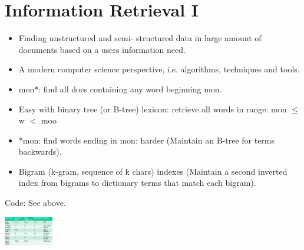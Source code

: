 
\section{Information Retrieval I}

\begin{breakbox}
\begin{itemize}
	\item Finding unstructured and semi- structured data in large amount of documents based on a users information need.
	\item A modern computer science perspective, i.e. algorithms, techniques and tools.
\end{itemize}
\end{breakbox}

\begin{breakbox}

\end{breakbox}

\begin{breakbox}
\begin{itemize}
	\item mon*: find all docs containing any word beginning mon.
	\item Easy with binary tree (or B-tree) lexicon: retrieve all words in range: mon $\leq$ w $<$ moo
	\item *mon: find words ending in mon: harder (Maintain an B-tree for terms backwards).
	\item Bigram (k-gram, sequence of k chars) indexes (Maintain a second inverted index from bigrams to dictionary terms that match each bigram).
\end{itemize}
Code: See above.
\end{breakbox}

\begin{breakbox}
	\begin{center}
		\includegraphics[width=0.16\textwidth]{slides_images/text_search_methods}
	\end{center}
\end{breakbox}

